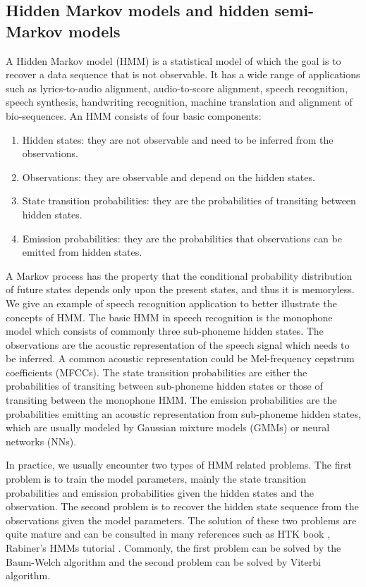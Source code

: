 \subsection{Hidden Markov models and hidden semi-Markov models}

A Hidden Markov model (HMM) is a statistical model of which the goal is to recover a data sequence that is not observable. It has a wide range of applications such as lyrics-to-audio alignment, audio-to-score alignment, speech recognition, speech synthesis, handwriting recognition, machine translation and alignment of bio-sequences. An HMM consists of four basic components:

\begin{enumerate}[noitemsep]
\item Hidden states: they are not observable and need to be inferred from the observations.
\item Observations: they are observable and depend on the hidden states.
\item State transition probabilities: they are the probabilities of transiting between hidden states.
\item Emission probabilities: they are the probabilities that observations can be emitted from hidden states.
\end{enumerate}

A Markov process has the property that the conditional probability distribution of future states depends only upon the present states, and thus it is memoryless. We give an example of speech recognition application to better illustrate the concepts of HMM. The basic HMM in speech recognition is the monophone model which consists of commonly three sub-phoneme hidden states. The observations are the acoustic representation of the speech signal which needs to be inferred. A common acoustic representation could be Mel-frequency cepstrum coefficients (MFCCs). The state transition probabilities are either the probabilities of transiting between sub-phoneme hidden states or those of transiting between the monophone HMM. The emission probabilities are the probabilities emitting an acoustic representation from sub-phoneme hidden states, which are usually modeled by Gaussian mixture models (GMMs) or neural networks (NNs).

In practice, we usually encounter two types of HMM related problems. The first problem is to train the model parameters, mainly the state transition probabilities and emission probabilities given the hidden states and the observation. The second problem is to recover the hidden state sequence from the observations given the model parameters. The solution of these two problems are quite mature and can be consulted in many references such as HTK book \cite{Young2006HTK}, Rabiner's HMMs tutorial \cite{rabiner1989tutorial}. Commonly, the first problem can be solved by the Baum-Welch algorithm and the second problem can be solved by Viterbi algorithm.

